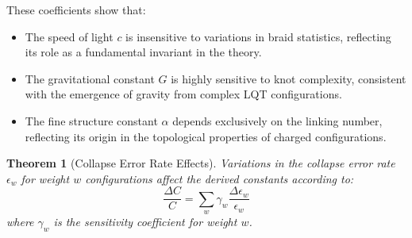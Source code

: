 \documentclass[11pt,a4paper]{article}
\makeatletter
\newtheorem{theorem}{Theorem}[section]
\renewenvironment{proof}[1][\proofname]{\par
  \pushQED{\qed}%
  \normalfont \topsep6\p@\@plus6\p@\relax
  \trivlist
  \item[\hskip\labelsep
        \itshape
    #1\@addpunct{.}]\ignorespaces
}{%
  \popQED\endtrivlist\@endpefalse
}
\makeatother
\begin{document}
\begin{proof}
These coefficients show that:
\begin{itemize}
    \item The speed of light $c$ is insensitive to variations in braid statistics, reflecting its role as a fundamental invariant in the theory.
    \item The gravitational constant $G$ is highly sensitive to knot complexity, consistent with the emergence of gravity from complex LQT configurations.
    \item The fine structure constant $\alpha$ depends exclusively on the linking number, reflecting its origin in the topological properties of charged configurations.
\end{itemize}
\end{proof}

\begin{theorem}[Collapse Error Rate Effects]
\label{thm:collapse_error}
Variations in the collapse error rate $\epsilon_w$ for weight $w$ configurations affect the derived constants according to:
\begin{equation}
\frac{\Delta C}{C} = \sum_w \gamma_w \frac{\Delta \epsilon_w}{\epsilon_w}
\label{eq:collapse_error_effect} %
\end{equation}
where $\gamma_w$ is the sensitivity coefficient for weight $w$.
\end{theorem}
\end{document}
